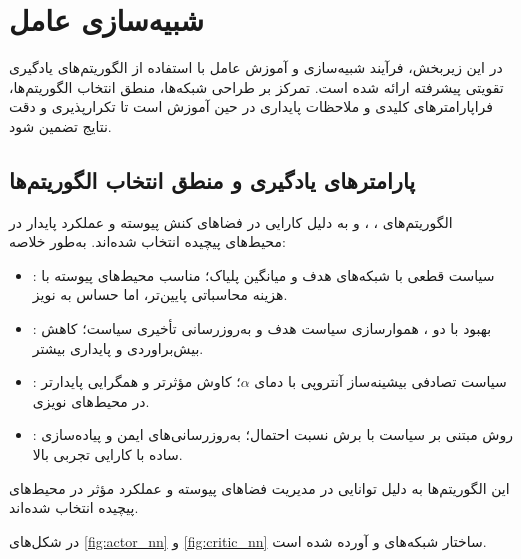 \section{شبیه‌سازی عامل}\label{sec:agent_sim}

در این زیربخش، فرآیند شبیه‌سازی و آموزش عامل با استفاده از الگوریتم‌های یادگیری تقویتی پیشرفته ارائه شده است. تمرکز بر طراحی شبکه‌ها، منطق انتخاب الگوریتم‌ها، فراپارامترهای کلیدی و ملاحظات پایداری در حین آموزش است تا تکرارپذیری و دقت نتایج تضمین شود.

\subsection{پارامترهای یادگیری و منطق انتخاب الگوریتم‌ها}
الگوریتم‌های ، ،  و  به دلیل کارایی در فضاهای کنش پیوسته و عملکرد پایدار در محیط‌های پیچیده انتخاب شده‌اند. به‌طور خلاصه:
\begin{itemize}
  \item {}: سیاست قطعی با شبکه‌های هدف و میانگین پلیاک؛ مناسب محیط‌های پیوسته با هزینه محاسباتی پایین‌تر، اما حساس به نویز.
  \item {}: بهبود  با دو ، هموارسازی سیاست هدف و به‌روزرسانی تأخیری سیاست؛ کاهش بیش‌براوردی  و پایداری بیشتر.
  \item {}: سیاست تصادفی بیشینه‌ساز آنتروپی با دمای \(\alpha\)؛ کاوش مؤثرتر و همگرایی پایدارتر در محیط‌های نویزی.
  \item {}: روش مبتنی بر سیاست با برش نسبت احتمال؛ به‌روزرسانی‌های ایمن و پیاده‌سازی ساده با کارایی تجربی بالا.
\end{itemize}
این الگوریتم‌ها به دلیل توانایی در مدیریت فضاهای پیوسته و عملکرد مؤثر در محیط‌های پیچیده انتخاب شده‌اند.

در شکل‌های \ref{fig:actor_nn} و \ref{fig:critic_nn} ساختار شبکه‌های  و  آورده شده است.












